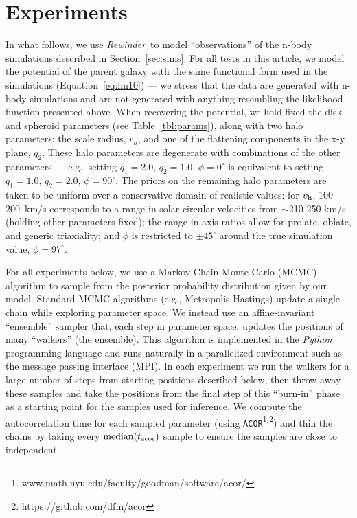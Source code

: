 \documentclass[letterpaper,12pt,preprint]{aastex}
\newcommand{\project}[1]{\textsl{#1}}
\newcommand{\vhalo}{v_{\rm h}}
\newcommand{\rewinder}{\emph{Rewinder}}
\begin{document}
\section{Experiments} \label{sec:experiments}
In what follows, we use \rewinder\, to model ``observations'' of the n-body simulations described in Section~\ref{sec:sims}. For all tests in this article, we model the potential of the parent galaxy with the same functional form used in the simulations (Equation~\ref{eq:lm10}) --- we stress that the data are generated with n-body simulations and are not generated with anything resembling the likelihood function presented above. When recovering the potential, we hold fixed the disk and spheroid parameters (see Table~\ref{tbl:params}), along with two halo parameters: the scale radius, $r_h$, and one of the flattening components in the x-y plane, $q_2$. These halo parameters are degenerate with combinations of the other parameters --- e.g., setting $q_1=2.0$, $q_2=1.0$, $\phi=0^\circ$ is equivalent to setting $q_1=1.0$, $q_2=2.0$, $\phi=90^\circ$. The priors on the remaining halo parameters are taken to be uniform over a conservative domain of realistic values: for $\vhalo$, 100-200~km/s corresponds to a range in solar circular velocities from $\sim$210-250 km/s (holding other parameters fixed); the range in axis ratios allow for prolate, oblate, and generic triaxiality; and $\phi$ is restricted to $\pm45^\circ$ around the true simulation value, $\phi = 97^\circ$.

For all experiments below, we use a Markov Chain Monte Carlo (MCMC) algorithm to sample from the posterior probability distribution given by our model. Standard MCMC algorithms (e.g., Metropolis-Hastings) update a single chain while exploring parameter space. We instead use an affine-invariant ``ensemble'' sampler \citep{goodman10} that, each step in parameter space, updates the positions of many ``walkers'' (the ensemble). This algorithm is implemented in the \project{Python} programming language \citep{foremanmackey13} and runs naturally in a parallelized environment such as the message passing interface (MPI). In each experiment we run the walkers for a large number of steps from starting positions described below, then throw away these samples and take the positions from the final step of this ``burn-in'' phase as a starting point for the samples used for inference. We compute the autocorrelation time for each sampled parameter (using \texttt{ACOR}\footnote{www.math.nyu.edu/faculty/goodman/software/acor/}$^{,}$\footnote{https://github.com/dfm/acor}) and thin the chains by taking every $\mathrm{median}(t_{\rm acor})$ sample to ensure the samples are close to independent.
\end{document}
